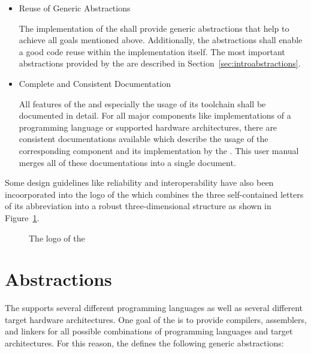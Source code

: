 \begin{itemize}
\item Reuse of Generic Abstractions\nopagebreak

The implementation of the \ecs{} shall provide generic abstractions that help to achieve all goals mentioned above.
Additionally, the abstractions shall enable a good code reuse within the implementation itself.
The most important abstractions provided by the \ecs{} are described in Section~\ref{sec:introabstractions}.

\item Complete and Consistent Documentation\nopagebreak

All features of the \ecs{} and especially the usage of its toolchain shall be documented in detail.
For all major components like implementations of a programming language or supported hardware architectures, there are consistent documentations available which describe the usage of the corresponding component and its implementation by the \ecs{}.
This user manual merges all of these documentations into a single document.

\end{itemize}

Some design guidelines like reliability and interoperability have also been incoorporated into the logo of the \ecs{} which combines the three self-contained letters of its abbreviation into a robust three-dimensional structure as shown in Figure~\ref{fig:intrologo}.

\begin{figure}
\centering\ecslogo{5em}
\caption{The logo of the \ecs{}}
\label{fig:intrologo}
\end{figure}

\section{Abstractions}\label{sec:introabstractions}

The \ecs{} supports several different programming languages as well as several different target hardware architectures.
One goal of the \ecs{} is to provide compilers, assemblers, and linkers for all possible combinations of programming languages and target architectures.
For this reason, the \ecs{} defines the following generic abstractions:

